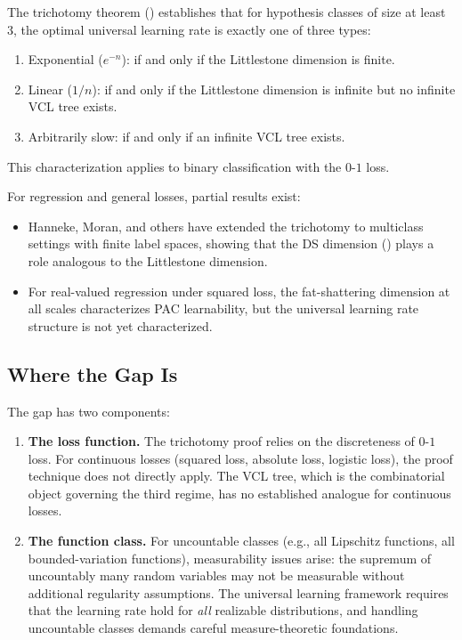 The trichotomy theorem () establishes that for hypothesis
classes of size at least 3, the optimal universal learning rate is exactly one
of three types:
\begin{enumerate}[leftmargin=*,nosep]
\item Exponential ($e^{-n}$): if and only if the Littlestone dimension is
  finite.
\item Linear ($1/n$): if and only if the Littlestone dimension is infinite
  but no infinite VCL tree exists.
\item Arbitrarily slow: if and only if an infinite VCL tree exists.
\end{enumerate}
This characterization applies to binary classification with the $0$-$1$ loss.

For regression and general losses, partial results exist:
\begin{itemize}[leftmargin=*]
\item Hanneke, Moran, and others have extended the trichotomy to multiclass
  settings with finite label spaces, showing that the DS dimension
  () plays a role analogous to the Littlestone dimension.
\item For real-valued regression under squared loss, the fat-shattering
  dimension at all scales characterizes PAC learnability, but the universal
  learning rate structure is not yet characterized.
\end{itemize}

\subsection{Where the Gap Is}

The gap has two components:

\begin{enumerate}[leftmargin=*]
\item \textbf{The loss function.}  The trichotomy proof relies on the
  discreteness of $0$-$1$ loss.  For continuous losses (squared loss,
  absolute loss, logistic loss), the proof technique does not directly
  apply.  The VCL tree, which is the combinatorial object governing the
  third regime, has no established analogue for continuous losses.

\item \textbf{The function class.}  For uncountable classes (e.g., all
  Lipschitz functions, all bounded-variation functions), measurability
  issues arise: the supremum of uncountably many random variables may not
  be measurable without additional regularity assumptions.  The universal
  learning framework requires that the learning rate hold for
  \emph{all} realizable distributions, and handling uncountable classes
  demands careful measure-theoretic foundations.
\end{enumerate}

